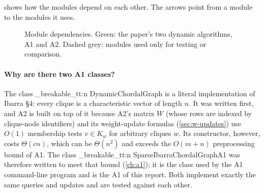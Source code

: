 \documentclass[11pt,a4paper,oneside]{report}
\theoremstyle{plain}
\theoremstyle{definition}
\theoremstyle{remark}
\DeclareRobustCommand{\code}[1]{\mtp_breakable_tt:n {#1}}
\begin{document}
 shows how the modules depend on each other. The arrows point from a module
to the modules it uses.

\begin{figure}[ht]
\centering
{}
\caption[Module dependencies]{Module dependencies. Green: the paper's two dynamic algorithms, A1 and A2.
Dashed grey: modules used only for testing or comparison.}
\label{fig:modules}
\end{figure}

\paragraph{Why are there two A1 classes?} The class \code{DynamicChordalGraph} is a literal
implementation of Ibarra \S4: every clique is a characteristic vector of length \(n\). It was
written first, and A2 is built on top of it because A2's matrix \(W\) (whose rows are indexed by
clique-node identifiers) and its weight-update formulas (\cref{sec:w-updates}) use \(O(1)\)
membership tests \(v\in K_w\) for arbitrary cliques \(w\). Its constructor, however, costs
\(\Theta(cn)\), which can be \(\Theta(n^2)\) and exceeds the \(O(m+n)\) preprocessing bound of
A1. The class \code{SparseIbarraChordalGraphA1} was therefore written to meet that bound
(\cref{ch:a1}); it is the class used by the A1 command-line program and is the A1 of this
report. Both implement exactly the same queries and updates and are tested against each other.
\end{document}
